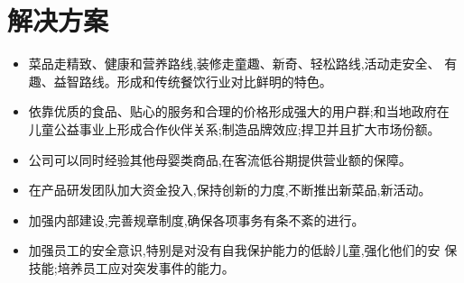 \section{解决方案}
\begin{itemize}
        \item  菜品走精致、健康和营养路线,装修走童趣、新奇、轻松路线,活动走安全、
                有趣、益智路线。形成和传统餐饮行业对比鲜明的特色。
        \item  依靠优质的食品、贴心的服务和合理的价格形成强大的用户群;和当地政府在
                儿童公益事业上形成合作伙伴关系;制造品牌效应;捍卫并且扩大市场份额。
        \item  公司可以同时经验其他母婴类商品,在客流低谷期提供营业额的保障。
        \item  在产品研发团队加大资金投入,保持创新的力度,不断推出新菜品,新活动。
        \item  加强内部建设,完善规章制度,确保各项事务有条不紊的进行。
        \item  加强员工的安全意识,特别是对没有自我保护能力的低龄儿童,强化他们的安
                保技能;培养员工应对突发事件的能力。
\end{itemize}
